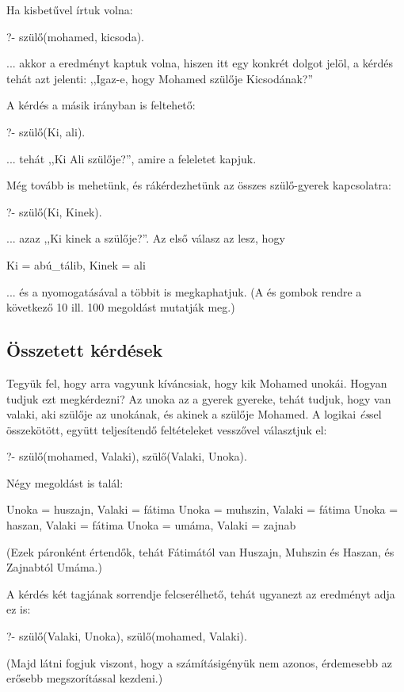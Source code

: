 Ha kisbetűvel írtuk volna:
\begin{query}
?- szülő(mohamed, kicsoda).
\end{query}
... akkor a  eredményt kaptuk volna, hiszen  itt egy konkrét dolgot jelöl, a kérdés tehát azt jelenti: ,,Igaz-e, hogy Mohamed szülője Kicsodának?''

A kérdés a másik irányban is feltehető:
\begin{query}
?- szülő(Ki, ali).
\end{query}
... tehát ,,Ki Ali szülője?'', amire a  feleletet kapjuk.

Még tovább is mehetünk, és rákérdezhetünk az összes szülő-gyerek kapcsolatra:
\begin{query}
?- szülő(Ki, Kinek).
\end{query}
... azaz ,,Ki kinek a szülője?''. Az első válasz az lesz, hogy
\begin{query}
Ki = abú_tálib,
Kinek = ali
\end{query}
... és a  nyomogatásával a többit is megkaphatjuk. (A  és  gombok rendre a következő 10 ill. 100 megoldást mutatják meg.)

\subsection*{Összetett kérdések}

Tegyük fel, hogy arra vagyunk kíváncsiak, hogy kik
Mohamed unokái. Hogyan tudjuk ezt megkérdezni? Az
unoka az a gyerek gyereke, tehát tudjuk, hogy van
valaki, aki szülője az unokának, és akinek a
szülője Mohamed. A logikai \emph{és}\/sel
összekötött, együtt teljesítendő feltételeket
vesszővel választjuk el:
\begin{query}
?- szülő(mohamed, Valaki), szülő(Valaki, Unoka).
\end{query}
Négy megoldást is talál:
\begin{query}
Unoka = huszajn,
Valaki = fátima
Unoka = muhszin,
Valaki = fátima
Unoka = haszan,
Valaki = fátima
Unoka = umáma,
Valaki = zajnab
\end{query}
(Ezek páronként értendők, tehát Fátimától van Huszajn, Muhszin és Haszan, és Zajnabtól Umáma.)

A kérdés két tagjának sorrendje felcserélhető, tehát ugyanezt az eredményt adja ez is:
\begin{query}
?- szülő(Valaki, Unoka), szülő(mohamed, Valaki).
\end{query}
(Majd látni fogjuk viszont, hogy a számításigényük nem azonos, érdemesebb az erősebb megszorítással kezdeni.)

